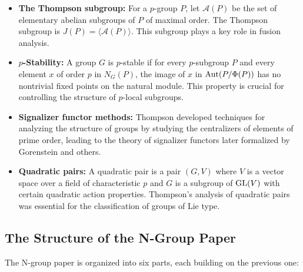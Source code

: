 \begin{itemize}
\item \textbf{The Thompson subgroup:} For a \(p\)-group \(P\), let \(\mathscr{A}(P)\) be the set of elementary abelian subgroups of \(P\) of maximal order. The Thompson subgroup is \(J(P) = \langle \mathscr{A}(P) \rangle\). This subgroup plays a key role in fusion analysis.

\item \textbf{\(p\)-Stability:} A group \(G\) is \(p\)-stable if for every \(p\)-subgroup \(P\) and every element \(x\) of order \(p\) in \(N_G(P)\), the image of \(x\) in \(\operatorname{Aut}(P/\Phi(P))\) has no nontrivial fixed points on the natural module. This property is crucial for controlling the structure of \(p\)-local subgroups.

\item \textbf{Signalizer functor methods:} Thompson developed techniques for analyzing the structure of groups by studying the centralizers of elements of prime order, leading to the theory of signalizer functors later formalized by Gorenstein and others.

\item \textbf{Quadratic pairs:} A quadratic pair is a pair \((G,V)\) where \(V\) is a vector space over a field of characteristic \(p\) and \(G\) is a subgroup of \(\operatorname{GL}(V)\) with certain quadratic action properties. Thompson's analysis of quadratic pairs was essential for the classification of groups of Lie type.
\end{itemize}

\subsection{The Structure of the N-Group Paper}

The N-group paper is organized into six parts, each building on the previous one:

